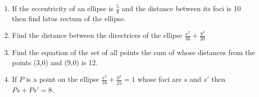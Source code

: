 \begin{enumerate}[label=\thesubsection.\arabic*,ref=\thesubsection.\theenumi]
 \item If the eccentricity of an ellipse is $\frac{5}{8}$ and  the distance between its foci is 10 then find latus rectum of the ellipse.
 \item Find the distance between the directrices of the ellipse $\frac{x^2}{36}+\frac{y^2}{20}$
\item Find the equation of the set of all points the sum of whose distances  from the points (3,0) and (9,0) is 12.
\item If ${P}$ is a point on the ellipse $\frac{x^2}{16}+\frac{y^2}{25}=1$ whose foci  are $s$ and $s'$ then $Ps +Ps'=8$.
\end{enumerate}
